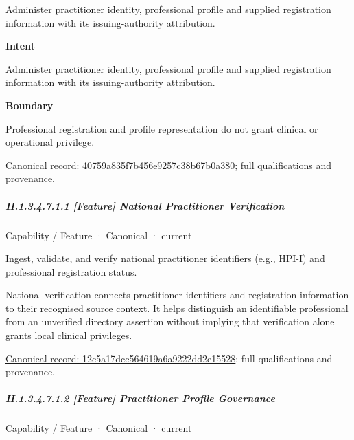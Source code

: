 Administer practitioner identity, professional profile and supplied registration information with its issuing-authority attribution.



\textbf{Intent}



Administer practitioner identity, professional profile and supplied registration information with its issuing-authority attribution.



\textbf{Boundary}



Professional registration and profile representation do not grant clinical or operational privilege.


{\footnotesize \href{../../../../continuum/strategy/capability/40759a835f7b456e9257c38b67b0a380.md}{Canonical record: 40759a835f7b456e9257c38b67b0a380}; full qualifications and provenance.}\par
\subparagraph*{II.1.3.4.7.1.1 [Feature] National Practitioner Verification}
\label{navigation:II.1.3.4.7.1.1}

\label{element:12c5a17dcc564619a6a9222dd2e15528}
{\small Capability / Feature · Canonical · current}\par

Ingest, validate, and verify national practitioner identifiers (e.g., HPI-I) and professional registration status.



National verification connects practitioner identifiers and registration information to their recognised source context. It helps distinguish an identifiable professional from an unverified directory assertion without implying that verification alone grants local clinical privileges.


{\footnotesize \href{../../../../continuum/strategy/capability/feature/12c5a17dcc564619a6a9222dd2e15528.md}{Canonical record: 12c5a17dcc564619a6a9222dd2e15528}; full qualifications and provenance.}\par
\subparagraph*{II.1.3.4.7.1.2 [Feature] Practitioner Profile Governance}
\label{navigation:II.1.3.4.7.1.2}

\label{element:d23be319c6114c28bcb9e24e1258a0fc}
{\small Capability / Feature · Canonical · current}\par

